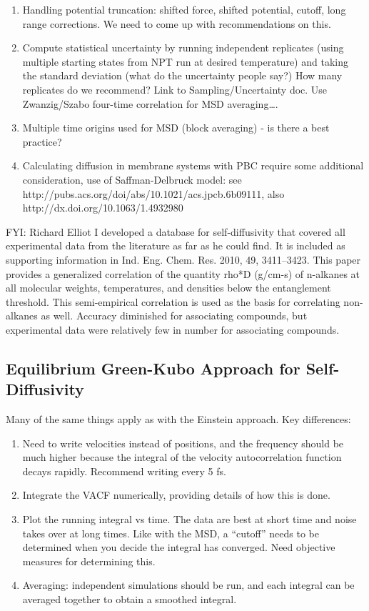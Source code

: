\documentclass[9pt]{livecoms}
\begin{document}
\begin{enumerate}
	\item Handling potential truncation: shifted force, shifted potential, cutoff, long range corrections. We need to come up with recommendations on this.
	\item Compute statistical uncertainty by running independent replicates (using multiple starting states from NPT run at desired temperature) and taking the standard deviation (what do the uncertainty people say?) How many replicates do we recommend? Link to Sampling/Uncertainty doc. Use Zwanzig/Szabo four-time correlation for MSD averaging….
	\item Multiple time origins used for MSD (block averaging) - is there a best practice?
	\item Calculating diffusion in membrane systems with PBC require some additional consideration, use of Saffman-Delbruck model: see http://pubs.acs.org/doi/abs/10.1021/acs.jpcb.6b09111, also http://dx.doi.org/10.1063/1.4932980
\end{enumerate}

FYI: Richard Elliot I developed a database for self-diffusivity that covered all experimental data from the literature as far as he could find. It is included as supporting information in Ind. Eng. Chem. Res. 2010, 49, 3411–3423. This paper provides a generalized correlation of the quantity rho*D (g/cm-s) of n-alkanes at all molecular weights, temperatures, and densities below the entanglement threshold. This semi-empirical correlation is used as the basis for correlating non-alkanes as well. Accuracy diminished for associating compounds, but experimental data were relatively few in number for associating compounds.

\subsection{Equilibrium Green-Kubo Approach for Self-Diffusivity}

Many of the same things apply as with the Einstein approach. Key differences:

\begin{enumerate}
	\item Need to write velocities instead of positions, and the frequency should be much higher because the integral of the velocity autocorrelation function decays rapidly. Recommend writing every 5 fs. 
	\item Integrate the VACF numerically, providing details of how this is done.
	\item Plot the running integral vs time. The data are best at short time and noise takes over at long times. Like with the MSD, a “cutoff” needs to be determined when you decide the integral has converged. Need objective measures for determining this.
	\item Averaging: independent simulations should be run, and each integral can be averaged together to obtain a smoothed integral. 
\end{enumerate}
\end{document}
